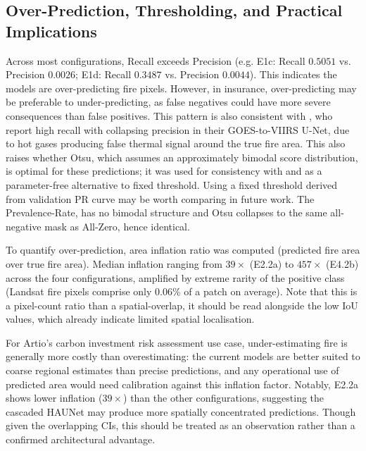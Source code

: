 \documentclass[a4paper, 11pt]{article} %
\begin{document}
\subsection{Over-Prediction, Thresholding, and Practical Implications}
Across most configurations, Recall exceeds Precision (e.g. E1c: Recall $0.5051$ vs. Precision $0.0026$; E1d: Recall $0.3487$ vs. Precision $0.0044$). This indicates the models are over-predicting fire pixels. However, in insurance, over-predicting may be preferable to under-predicting, as false negatives could have more severe consequences than false positives. This pattern is also consistent with \cite{mccarthyDeepLearningApproach2021}, who report high recall with collapsing precision in their GOES-to-VIIRS U-Net, due to hot gases producing false thermal signal around the true fire area. This also raises whether Otsu, which assumes an approximately bimodal score distribution, is optimal for these predictions; it was used for consistency with \cite{badhanDeepLearningApproach2024} and as a parameter-free alternative to fixed threshold. Using a fixed threshold derived from validation PR curve may be worth comparing in future work. The Prevalence-Rate, has no bimodal structure and Otsu collapses to the same all-negative mask as All-Zero, hence identical.

To quantify over-prediction, area inflation ratio was computed (predicted fire area over true fire area). Median inflation ranging from $39\times$ (E2.2a) to $457\times$ (E4.2b) across the four configurations, amplified by extreme rarity of the positive class (Landsat fire pixels comprise only 0.06\% of a patch on average). Note that this is a pixel-count ratio than a spatial-overlap, it should be read alongside the low IoU values, which already indicate limited spatial localisation.

For Artio's carbon investment risk assessment use case, under-estimating fire is generally more costly than overestimating: the current models are better suited to coarse regional estimates than precise predictions, and any operational use of predicted area would need calibration against this inflation factor. Notably, E2.2a shows lower inflation ($39\times$) than the other configurations, suggesting the cascaded HAUNet may produce more spatially concentrated predictions. Though given the overlapping CIs, this should be treated as an observation rather than a confirmed architectural advantage.
\end{document}
